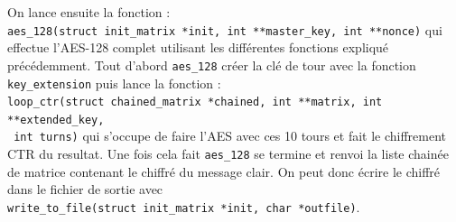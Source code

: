 \documentclass[10pt, a4paper]{report}
\begin{document}
	On lance ensuite la fonction :\\ \verb|aes_128(struct init_matrix *init, int **master_key, int **nonce)| qui effectue l'AES-128 complet utilisant les différentes fonctions expliqué précédemment. Tout d'abord \verb|aes_128| créer la clé de tour avec la fonction \verb|key_extension| puis lance la fonction : \\ \verb|loop_ctr(struct chained_matrix *chained, int **matrix, int **extended_key,|
	\\\verb| int turns)| qui s'occupe de faire l'AES avec ces 10 tours et fait le chiffrement CTR du resultat.
	Une fois cela fait \verb|aes_128| se termine et renvoi la liste chainée de matrice contenant le chiffré du message clair. On peut donc écrire le chiffré dans le fichier de sortie avec \\ \verb|write_to_file(struct init_matrix *init, char *outfile)|.
\end{document}
